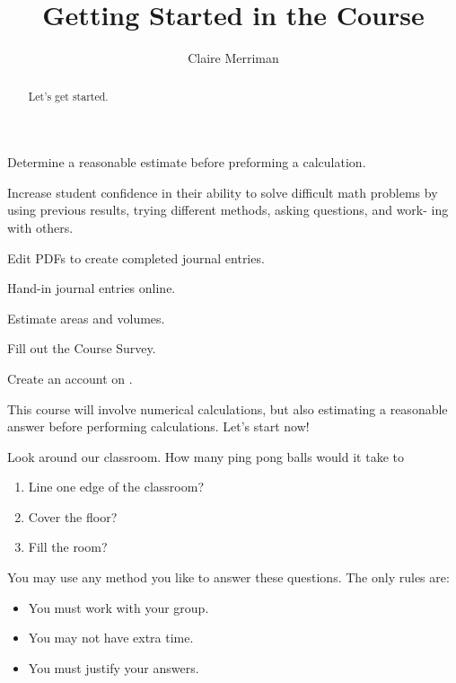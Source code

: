 \documentclass[handout,numbers,nooutcomes,hints]{../ximera}
\title{Getting Started in the Course}
\author{Claire Merriman}
\begin{document}
\begin{abstract}
  Let's get started.
\end{abstract}
\maketitle


\begin{listObjectives}
 \item{Determine a reasonable estimate before preforming a calculation.}
 \item{Increase student confidence in their ability to solve difficult math problems by using previous results, trying different methods, asking questions, and work- ing with others.}
\end{listObjectives}

\begin{listOutcomes}
\item{Edit PDFs to create completed journal entries.}
\item{Hand-in journal entries online.}
\item{Estimate areas and volumes.}
\item{Fill out the Course Survey.}
\item{Create an account on \snap.}
\end{listOutcomes}

This course will involve numerical calculations, but also estimating a reasonable answer before performing calculations. Let's start now!


\begin{question}
Look around our classroom. How many ping pong balls would it take to
\begin{enumerate}
\item Line one edge of the classroom?
 \item Cover the floor?
 \item Fill the room?
\end{enumerate}

You may use any method you like to answer these questions. The only rules are:
\begin{itemize}
 \item You must work with your group.
 \item You may not have extra time.
 \item You must justify your answers.
\end{itemize}

\end{question}
\newpage
\end{document}
